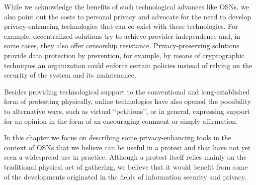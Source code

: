 While we acknowledge the benefits of such technological advances like
\acp{OSN}, we also point out the costs to personal privacy and
advocate for the need to develop privacy-enhancing technologies that
can co-exist with these technologies. For example, decentralized
solutions try to achieve provider independence and, in some cases,
they also offer censorship resistance. Privacy-preserving solutions
provide data protection by prevention, for example, by means of
cryptographic techniques an organization could enforce certain
policies instead of relying on the security of the system and its
maintenance.

Besides providing technological support to the conventional and
long-established form of protesting physically, online technologies
have also opened the possibility to alternative ways, such as virtual
\enquote{petitions}, or in general, expressing support for an opinion
in the form of an encouraging comment or simply affirmation.


In this chapter we focus on describing some privacy-enhancing tools in
the context of \acp{OSN} that we believe can be useful in a protest
and that have not yet seen a widespread use in practice. Although a
protest itself relies mainly on the traditional physical act of
gathering, we believe that it would benefit from some of the
developments originated in the fields of information security and
privacy.

